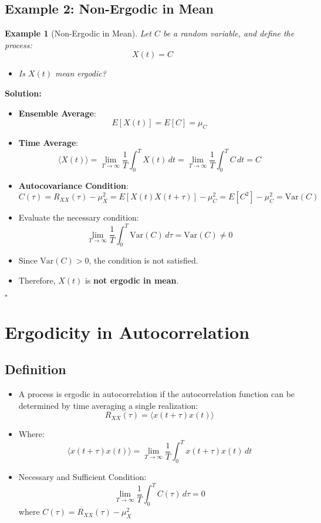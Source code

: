 \documentclass[12pt]{article}
\newtheorem{example}{Example}
\newenvironment{solution}{\noindent\textbf{Solution:}}{\hfill$\square$}
\begin{document}
\subsection{Example 2: Non-Ergodic in Mean}
\begin{example}[Non-Ergodic in Mean]
Let \( C \) be a random variable, and define the process:
\[
X(t) = C
\]
\begin{itemize}
    \item Is \( X(t) \) mean ergodic?
\end{itemize}
\end{example}
\begin{solution}
\begin{itemize}
    \item \textbf{Ensemble Average}:
    \[
    E[X(t)] = E[C] = \mu_C
    \]
    \item \textbf{Time Average}:
    \[
    \langle X(t) \rangle = \lim_{T \to \infty} \frac{1}{T} \int_{0}^{T} X(t) \, dt = \lim_{T \to \infty} \frac{1}{T} \int_{0}^{T} C \, dt = C
    \]
    \item \textbf{Autocovariance Condition}:
    \[
    C(\tau) = R_{XX}(\tau) - \mu_X^2 = E[X(t) X(t+\tau)] - \mu_C^2 = E[C^2] - \mu_C^2 = \text{Var}(C)
    \]
    \item Evaluate the necessary condition:
    \[
    \lim_{T \to \infty} \frac{1}{T} \int_{0}^{T} \text{Var}(C) \, d\tau = \text{Var}(C) \neq 0
    \]
    \item Since \( \text{Var}(C) > 0 \), the condition is not satisfied.
    \item Therefore, \( X(t) \) is \textbf{not ergodic in mean}.
\end{itemize}
\end{solution}

\section{Ergodicity in Autocorrelation}

\subsection{Definition}
\begin{itemize}
    \item A process is ergodic in autocorrelation if the autocorrelation function can be determined by time averaging a single realization:
    \[
    R_{XX}(\tau) = \langle x(t+\tau)x(t) \rangle
    \]
    \item Where:
    \[
    \langle x(t+\tau)x(t) \rangle = \lim_{T \to \infty} \frac{1}{T} \int_{0}^{T} x(t+\tau)x(t) \, dt
    \]
    \item Necessary and Sufficient Condition:
    \[
    \lim_{T \to \infty} \frac{1}{T} \int_{0}^{T} C(\tau) \, d\tau = 0
    \]
    where \( C(\tau) = R_{XX}(\tau) - \mu_X^2 \)
\end{itemize}
\end{document}
